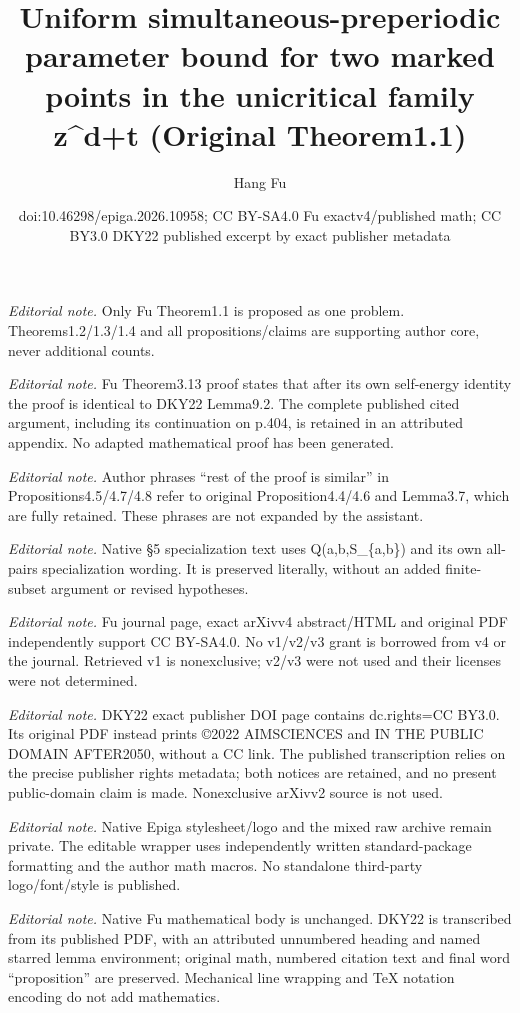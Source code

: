 \documentclass[10pt,a4paper]{amsart}
\title{Uniform simultaneous-preperiodic parameter bound for two marked points in the unicritical family z\textasciicircum{}d+t (Original Theorem1.1)}
\author{Hang Fu}
\date{doi:10.46298/epiga.2026.10958; CC BY-SA4.0 Fu exactv4/published math; CC BY3.0 DKY22 published excerpt by exact publisher metadata}
\numberwithin{equation}{section}
\theoremstyle{plain}
\theoremstyle{definition}
\theoremstyle{remark}
\begin{document}
\maketitle
\noindent\textit{Editorial note.} Only Fu Theorem1.1 is proposed as one problem. Theorems1.2/1.3/1.4 and all propositions/claims are supporting author core, never additional counts.\par\medskip
\noindent\textit{Editorial note.} Fu Theorem3.13 proof states that after its own self-energy identity the proof is identical to DKY22 Lemma9.2. The complete published cited argument, including its continuation on p.404, is retained in an attributed appendix. No adapted mathematical proof has been generated.\par\medskip
\noindent\textit{Editorial note.} Author phrases “rest of the proof is similar” in Propositions4.5/4.7/4.8 refer to original Proposition4.4/4.6 and Lemma3.7, which are fully retained. These phrases are not expanded by the assistant.\par\medskip
\noindent\textit{Editorial note.} Native §5 specialization text uses Q(a,b,S\_\{a,b\}) and its own all-pairs specialization wording. It is preserved literally, without an added finite-subset argument or revised hypotheses.\par\medskip
\noindent\textit{Editorial note.} Fu journal page, exact arXivv4 abstract/HTML and original PDF independently support CC BY-SA4.0. No v1/v2/v3 grant is borrowed from v4 or the journal. Retrieved v1 is nonexclusive; v2/v3 were not used and their licenses were not determined.\par\medskip
\noindent\textit{Editorial note.} DKY22 exact publisher DOI page contains dc.rights=CC BY3.0. Its original PDF instead prints ©2022 AIMSCIENCES and IN THE PUBLIC DOMAIN AFTER2050, without a CC link. The published transcription relies on the precise publisher rights metadata; both notices are retained, and no present public-domain claim is made. Nonexclusive arXivv2 source is not used.\par\medskip
\noindent\textit{Editorial note.} Native Epiga stylesheet/logo and the mixed raw archive remain private. The editable wrapper uses independently written standard-package formatting and the author math macros. No standalone third-party logo/font/style is published.\par\medskip
\noindent\textit{Editorial note.} Native Fu mathematical body is unchanged. DKY22 is transcribed from its published PDF, with an attributed unnumbered heading and named starred lemma environment; original math, numbered citation text and final word “proposition” are preserved. Mechanical line wrapping and TeX notation encoding do not add mathematics.\par\medskip
\end{document}
